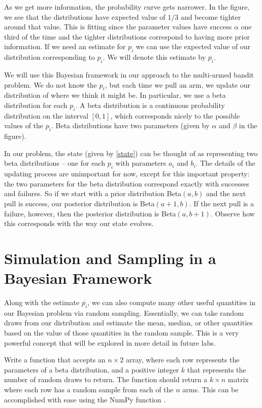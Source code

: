 As we get more information, the probability curve gets narrower.
In the figure, we see that the distributions have expected
value of $1/3$ and become tighter around that value.
This is fitting since the parameter values have success $\alpha$ one
third of the time and the tighter distributions correspond to having
more prior information.  If we need an estimate for $p_i$ we can use
the expected value of our distribution corresponding to $p_i$.
We will denote this estimate by $\overline{p_i}$.

We will use this Bayesian framework in our approach to the multi-armed bandit problem.
We do not know the $p_i$, but each time we pull an arm, we update our distribution of
where we think it might be.
In particular, we use a beta distribution for each $p_i$.
A beta distribution is a continuous probability distribution on the interval $[0,1]$,
which corresponds nicely to the possible values of the $p_i$.  Beta distributions have
two parameters (given by $\alpha$ and $\beta$ in the figure).

In our problem, the state (given by \eqref{state}) can be thought of as representing two
beta distributions -- one for each $p_i$ with parameters $a_i$ and $b_i$.
The details of the updating process are unimportant for now, except
for this important property: the two parameters for the beta distribution
correspond exactly with successes and failures.
So if we start with a prior distribution Beta$(a,b)$ and the next pull is success,
our posterior distribution is Beta$(a+1,b)$. If the next pull is a failure, however, then
the posterior distribution is Beta$(a,b+1)$.
Observe how this corresponds with the way our state evolves.

\section*{Simulation and Sampling in a Bayesian Framework}
Along with the estimate $\overline{p_i}$, we can also compute many other useful
quantities in our Bayesian problem via random sampling.  Essentially, we can take
random draws from our distribution and estimate the mean, median, or other
quantities based on the value of those quantities in the random sample.
This is a very powerful concept that will be explored in more detail in future labs.

\begin{problem}
Write a function  that accepts an $n\times 2$ array, where each
row represents the parameters of a beta distribution, and a positive integer $k$
that represents the number of random draws to return.
The function should return a $k\times n$ matrix where each row has a random sample
from each of the $n$ arms.  This can be accomplished with ease using the NumPy function
.
\label{prob:simdata}
\end{problem}

